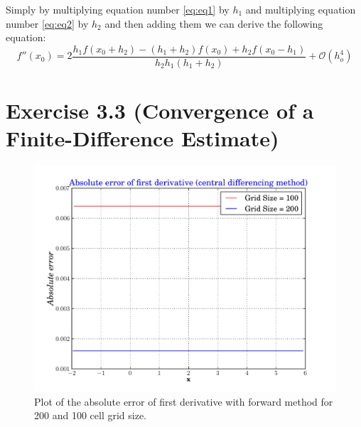 \documentclass[10pt]{article}
\begin{document}
Simply by multiplying equation number \ref{eq:eq1} by $h_1$ and multiplying equation number \ref{eq:eq2} by $h_2$ and then adding them we can derive the following equation:\\

\begin{equation}\label{eq:eq3}
f''(x_0) = 2\frac{h_1f(x_0+h_2) - (h_1 + h_2)f(x_0) + h_2f(x_0-h_1)}{h_2 h_1 (h_1 + h_2)}  + \mathcal{O}(h^4_o)  
\end{equation}



\section{Exercise 3.3 (Convergence of a Finite-Difference Estimate)}

\begin{figure}[h]
  \begin{center}
    \includegraphics[totalheight=0.5\textheight]{plot1.pdf}
    \caption{\label{fig:ForwardMethod} Plot of the absolute error of first derivative with forward method for 200 and 100 cell grid size.}
  \end{center}
\end{figure}
\end{document}
